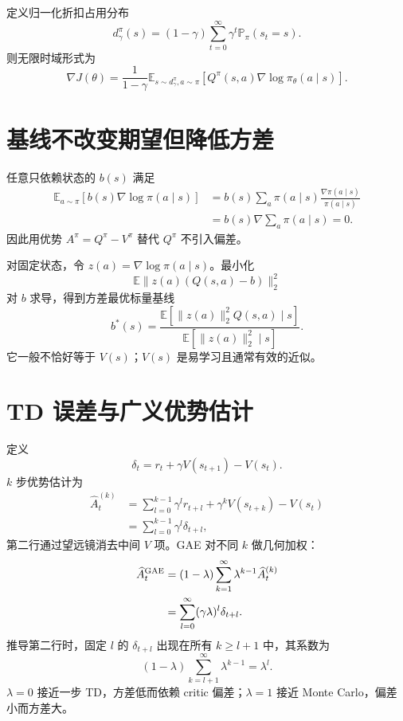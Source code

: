 \documentclass[11pt]{article}
\numberwithin{equation}{section}
\newcommand{\E}{\mathbb{E}}
\newcommand{\Pp}{\mathbb{P}}
\newcommand{\1}{\mathbf{1}}
\begin{document}
定义归一化折扣占用分布
\begin{equation}
 d_\gamma^\pi(s)=(1-\gamma)\sum_{t=0}^{\infty}\gamma^t
 \Pp_\pi(s_t=s).
\end{equation}
则无限时域形式为
\begin{equation}
 \nabla J(\theta)=\frac1{1-\gamma}
 \E_{s\sim d_\gamma^\pi,a\sim\pi}
 [Q^\pi(s,a)\nabla\log\pi_\theta(a\mid s)].
\end{equation}

\section{基线不改变期望但降低方差}

任意只依赖状态的 $b(s)$ 满足
\begin{align}
 \E_{a\sim\pi}[b(s)\nabla\log\pi(a\mid s)]
 &=b(s)\sum_a\pi(a\mid s)\frac{\nabla\pi(a\mid s)}{\pi(a\mid s)}\\
 &=b(s)\nabla\sum_a\pi(a\mid s)=0.
\end{align}
因此用优势 $A^\pi=Q^\pi-V^\pi$ 替代 $Q^\pi$ 不引入偏差。

对固定状态，令 $z(a)=\nabla\log\pi(a\mid s)$。最小化
\begin{equation}
 \E\|z(a)(Q(s,a)-b)\|_2^2
\end{equation}
对 $b$ 求导，得到方差最优标量基线
\begin{equation}
 b^*(s)=\frac{\E[\|z(a)\|_2^2Q(s,a)\mid s]}
 {\E[\|z(a)\|_2^2\mid s]}.
\end{equation}
它一般不恰好等于 $V(s)$；$V(s)$ 是易学习且通常有效的近似。

\section{TD 误差与广义优势估计}

定义
\begin{equation}
 \delta_t=r_t+\gamma V(s_{t+1})-V(s_t).
\end{equation}
$k$ 步优势估计为
\begin{align}
 \widehat A_t^{(k)}
 &=\sum_{l=0}^{k-1}\gamma^lr_{t+l}
 +\gamma^kV(s_{t+k})-V(s_t)\\
 &=\sum_{l=0}^{k-1}\gamma^l\delta_{t+l},
\end{align}
第二行通过望远镜消去中间 $V$ 项。GAE 对不同 $k$ 做几何加权：
\begin{align}
 \widehat A_t^{\rm GAE}
 &=(1-\lambda)\sum_{k=1}^{\infty}\lambda^{k-1}
 \widehat A_t^{(k)}\\
 &=\sum_{l=0}^{\infty}(\gamma\lambda)^l\delta_{t+l}.
\end{align}
推导第二行时，固定 $l$ 的 $\delta_{t+l}$ 出现在所有 $k\ge l+1$ 中，其系数为
\begin{equation}
 (1-\lambda)\sum_{k=l+1}^{\infty}\lambda^{k-1}=\lambda^l.
\end{equation}
$\lambda=0$ 接近一步 TD，方差低而依赖 critic 偏差；$\lambda=1$ 接近 Monte Carlo，偏差小而方差大。
\end{document}
